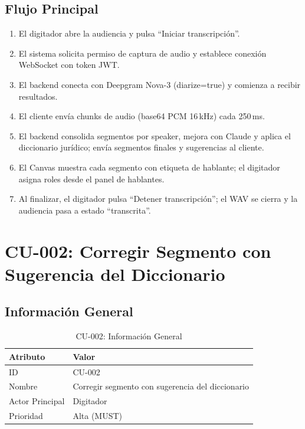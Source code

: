 \documentclass[12pt,a4paper]{report}
\begin{document}
\subsection{Flujo Principal}

\begin{enumerate}
    \item El digitador abre la audiencia y pulsa ``Iniciar transcripción''.
    \item El sistema solicita permiso de captura de audio y establece conexión WebSocket con token JWT.
    \item El backend conecta con Deepgram Nova-3 (diarize=true) y comienza a recibir resultados.
    \item El cliente envía chunks de audio (base64 PCM 16\,kHz) cada 250\,ms.
    \item El backend consolida segmentos por speaker, mejora con Claude y aplica el diccionario jurídico; envía segmentos finales y sugerencias al cliente.
    \item El Canvas muestra cada segmento con etiqueta de hablante; el digitador asigna roles desde el panel de hablantes.
    \item Al finalizar, el digitador pulsa ``Detener transcripción''; el WAV se cierra y la audiencia pasa a estado ``transcrita''.
\end{enumerate}

\section{CU-002: Corregir Segmento con Sugerencia del Diccionario}

\subsection{Información General}

\begin{table}[H]
\centering
\small
\begin{tabular}{|p{3.5cm}|p{9.5cm}|}
\hline
\rowcolor{primaryblue!20}
\textbf{Atributo} & \textbf{Valor} \\
\hline
ID & CU-002 \\
\hline
Nombre & Corregir segmento con sugerencia del diccionario \\
\hline
Actor Principal & Digitador \\
\hline
Prioridad & Alta (MUST) \\
\hline
\end{tabular}
\caption{CU-002: Información General}
\end{table}
\end{document}
